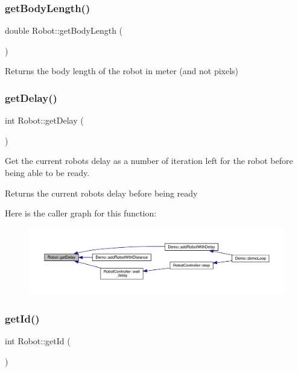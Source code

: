 \subsubsection{\texorpdfstring{get\+Body\+Length()}{getBodyLength()}}
{\footnotesize\ttfamily double Robot\+::get\+Body\+Length (\begin{DoxyParamCaption}{ }\end{DoxyParamCaption})}

\begin{DoxyReturn}{Returns}
the body length of the robot in meter (and not pixels) 
\end{DoxyReturn}
\mbox{\label{class_robot_ad9b03690ffb189f0990dacb813b2b72c}} 
\subsubsection{\texorpdfstring{get\+Delay()}{getDelay()}}
{\footnotesize\ttfamily int Robot\+::get\+Delay (\begin{DoxyParamCaption}{ }\end{DoxyParamCaption})}

Get the current robot\textquotesingle{}s delay as a number of iteration left for the robot before being able to be ready. \begin{DoxyReturn}{Returns}
the current robot\textquotesingle{}s delay before being ready 
\end{DoxyReturn}
Here is the caller graph for this function\+:\nopagebreak
\begin{figure}[H]
\begin{center}
\leavevmode
\includegraphics[width=350pt]{class_robot_ad9b03690ffb189f0990dacb813b2b72c_icgraph}
\end{center}
\end{figure}
\mbox{\label{class_robot_a8d1d94c9cab78a96851785b1679cd457}} 
\subsubsection{\texorpdfstring{get\+Id()}{getId()}}
{\footnotesize\ttfamily int Robot\+::get\+Id (\begin{DoxyParamCaption}{ }\end{DoxyParamCaption})}

